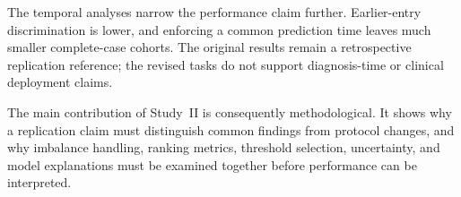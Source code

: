 The temporal analyses narrow the performance claim further. Earlier-entry discrimination is lower, and enforcing a common prediction time leaves much smaller complete-case cohorts. The original results remain a retrospective replication reference; the revised tasks do not support diagnosis-time or clinical deployment claims.

The main contribution of Study~II is consequently methodological. It shows why a replication claim must distinguish common findings from protocol changes, and why imbalance handling, ranking metrics, threshold selection, uncertainty, and model explanations must be examined together before performance can be interpreted.

